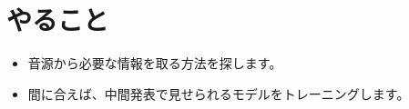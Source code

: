 \documentclass[a4paper, 12pt]{article}
\begin{document}


\section*{やること}
\begin{itemize}
    \item 音源から必要な情報を取る方法を探します。
    \item 間に合えば、中間発表で見せられるモデルをトレーニングします。
\end{itemize}



\end{document}
